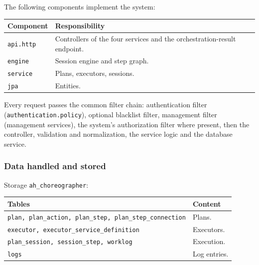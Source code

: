 \documentclass[a4paper]{arrowhead}
\begin{document}
The following components implement the system:

\noindent\begin{longtable}{| p{5.6cm} | p{9.6cm} |} \hline
\rowcolor{gray!33} Component & Responsibility \\ \hline \endhead
\texttt{api.\allowbreak{}http} & Controllers of the four services and the orchestration-result endpoint. \\ \hline
\texttt{engine} & Session engine and step graph. \\ \hline
\texttt{service} & Plans, executors, sessions. \\ \hline
\texttt{jpa} & Entities. \\ \hline
\end{longtable}

Every request passes the common filter chain: authentication filter (\texttt{authentication.\allowbreak{}policy}), optional blacklist filter, management filter (management services), the system's authorization filter where present, then the controller, validation and normalization, the service logic and the database service.

\subsubsection{Data handled and stored}

Storage \texttt{ah\_\allowbreak{}choreographer}:

\noindent\begin{longtable}{| p{6.4cm} | p{8.8cm} |} \hline
\rowcolor{gray!33} Tables & Content \\ \hline \endhead
\texttt{plan,\allowbreak{} plan\_\allowbreak{}action,\allowbreak{} plan\_\allowbreak{}step,\allowbreak{} plan\_\allowbreak{}step\_\allowbreak{}connection} & Plans. \\ \hline
\texttt{executor,\allowbreak{} executor\_\allowbreak{}service\_\allowbreak{}definition} & Executors. \\ \hline
\texttt{plan\_\allowbreak{}session,\allowbreak{} session\_\allowbreak{}step,\allowbreak{} worklog} & Execution. \\ \hline
\texttt{logs} & Log entries. \\ \hline
\end{longtable}
\end{document}
